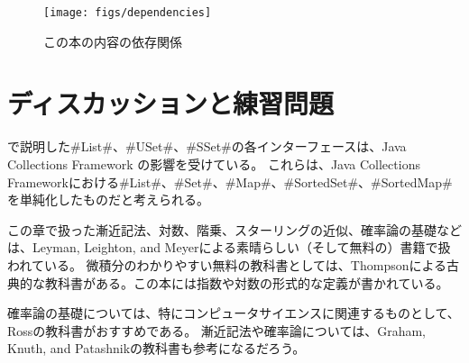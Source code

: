 \begin{figure}
  \begin{center}
    \texttt{[image: figs/dependencies]}
  \end{center}
  \caption{この本の内容の依存関係}
\end{figure}

\section{ディスカッションと練習問題}

で説明した#List#、#USet#、#SSet#の各インターフェースは、Java Collections Framework \cite{oracle_collections}の影響を受けている。
%
これらは、Java Collections Frameworkにおける#List#、#Set#、#Map#、#SortedSet#、#SortedMap#を単純化したものだと考えられる。

この章で扱った漸近記法、対数、階乗、スターリングの近似、確率論の基礎などは、Leyman, Leighton, and Meyerによる素晴らしい（そして無料の）書籍\cite{llm11}で扱われている。
微積分のわかりやすい無料の教科書としては、Thompsonによる古典的な教科書\cite{t14}がある。この本には指数や対数の形式的な定義が書かれている。

確率論の基礎については、特にコンピュータサイエンスに関連するものとして、Rossの教科書\cite{r01}がおすすめである。
漸近記法や確率論については、Graham, Knuth, and Patashnikの教科書\cite{gkp94}も参考になるだろう。


